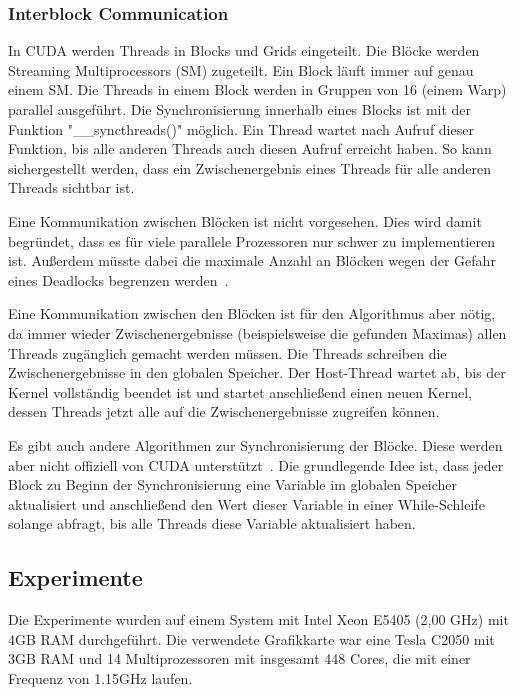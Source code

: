 \documentclass[ngerman]{scrartcl}
\begin{document}
\subsubsection{Interblock Communication}
In CUDA werden Threads in Blocks und Grids eingeteilt.
Die Blöcke werden Streaming Multiprocessors (SM) zugeteilt.
Ein Block läuft immer auf genau einem SM.
Die Threads in einem Block werden in Gruppen von 16 (einem Warp) parallel ausgeführt.
Die Synchronisierung innerhalb eines Blocks ist mit der Funktion "\_\_syncthreads()" möglich.
Ein Thread wartet nach Aufruf dieser Funktion, bis alle anderen Threads auch diesen Aufruf erreicht haben.
So kann sichergestellt werden, dass ein Zwischenergebnis eines Threads für alle anderen Threads sichtbar ist.

Eine Kommunikation zwischen Blöcken ist nicht vorgesehen.
Dies wird damit begründet, dass es für viele parallele Prozessoren nur schwer zu implementieren ist.
Außerdem müsste dabei die maximale Anzahl an Blöcken wegen der Gefahr eines Deadlocks begrenzen werden~\cite{parallelreduction}.

Eine Kommunikation zwischen den Blöcken ist für den Algorithmus aber nötig, da immer wieder Zwischenergebnisse (beispielsweise die gefunden Maximas) allen Threads zugänglich gemacht werden müssen.
Die Threads schreiben die Zwischenergebnisse in den globalen Speicher. Der Host-Thread wartet ab, bis der Kernel vollständig beendet ist und startet anschließend einen neuen Kernel, dessen Threads jetzt alle auf die Zwischenergebnisse zugreifen können.

Es gibt auch andere Algorithmen zur Synchronisierung der Blöcke. Diese werden aber nicht offiziell von CUDA unterstützt~\cite{interblockgpusync}.
Die grundlegende Idee ist, dass jeder Block zu Beginn der Synchronisierung eine Variable im globalen Speicher aktualisiert und anschließend den Wert dieser Variable in einer While-Schleife solange abfragt, bis alle Threads diese Variable aktualisiert haben.
\subsection{Experimente}
Die Experimente wurden auf einem System mit Intel Xeon E5405 (2,00 GHz) mit 4GB RAM durchgeführt. 
Die verwendete Grafikkarte war eine Tesla C2050 mit 3GB RAM und 14 Multiprozessoren mit insgesamt 448 Cores, 
die mit einer Frequenz von 1.15GHz laufen. 
\end{document}
